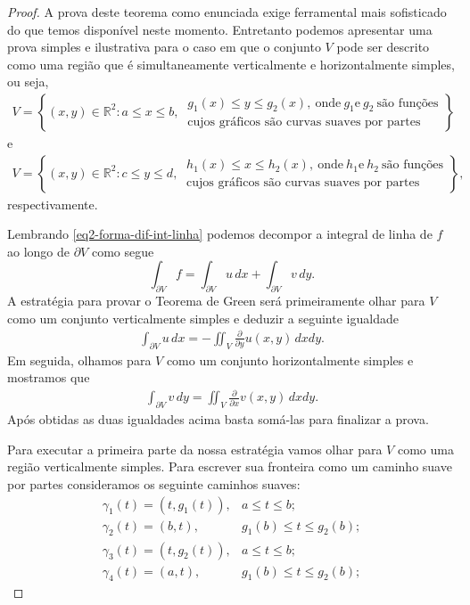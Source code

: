 \begin{proof}
A prova deste teorema como enunciada exige ferramental mais sofisticado do que temos disponível neste momento.
Entretanto podemos apresentar uma prova simples e ilustrativa para o caso em que o conjunto $V$ 
pode ser descrito como uma região que é simultaneamente verticalmente e horizontalmente simples, ou seja,
\begin{align*}
V=
\left\{ 
	(x,y)\in \mathbb{R}^2 : a\leqslant x\leqslant b, \
	\begin{array}{l}
		g_1(x)\leqslant y\leqslant g_2(x),\ \text{onde}\ g_1 \text{e}\ g_2 \ \text{são funções}
		\\
		\text{cujos gráficos são curvas suaves por partes} 
	\end{array}
\right\}
\end{align*}
e 
\begin{align*}
V=
\left\{ 
	(x,y)\in \mathbb{R}^2 : c\leqslant y\leqslant d, \
	\begin{array}{l}
		h_1(x)\leqslant x\leqslant h_2(x),\ \text{onde}\ h_1 \text{e}\ h_2 \ \text{são funções}
		\\
		\text{cujos gráficos são curvas suaves por partes} 
	\end{array}
\right\},
\end{align*}
respectivamente.

Lembrando \eqref{eq2-forma-dif-int-linha} podemos decompor a integral de linha de $f$ ao longo de $\partial V$
como segue
\[
\int_{\partial V} f = \int_{\partial V} u\, dx +\int_{\partial V} v\, dy.
\]
A estratégia para provar o Teorema de Green  
será primeiramente olhar para $V$ como um conjunto verticalmente simples 
e deduzir a seguinte igualdade
\begin{align}\label{eq-conclusao1-teo-green}
\int_{\partial V} u\, dx = -\iint_{V} \frac{\partial}{\partial y}u(x,y)\, dxdy.
\end{align}
Em seguida, olhamos  para $V$ como um conjunto horizontalmente simples e mostramos
que 
\begin{align}\label{eq-conclusao2-teo-green}
\int_{\partial V} v\, dy = \iint_{V} \frac{\partial}{\partial x}v(x,y)\, dxdy.
\end{align}
Após obtidas as duas igualdades acima basta somá-las para finalizar a prova.

\bigskip 

Para executar a primeira parte da nossa estratégia vamos olhar para $V$ como uma região 
verticalmente simples. Para escrever sua fronteira como um caminho suave por partes consideramos
os seguinte caminhos suaves:
\[
\begin{array}{lc}
\gamma_1(t) = (t,g_1(t)),& a\leqslant t\leqslant b;
\\
\gamma_2(t) = (b,t),& g_1(b)\leqslant t\leqslant g_2(b);
\\
\gamma_{3}(t) = (t,g_2(t)),&  a\leqslant t\leqslant b;
\\
\gamma_{4}(t) = (a,t),& g_1(b)\leqslant t\leqslant g_2(b);
\end{array} 
\]


\end{proof}
